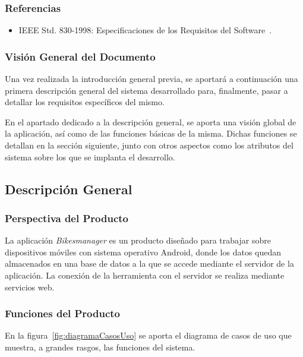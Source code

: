 \subsubsection{Referencias}

\begin{itemize}
	\item IEEE Std. 830-1998: Especificaciones de los Requisitos del Software~\cite{IE830}.
\end{itemize}

\subsubsection{Visión General del Documento}

Una vez realizada la introducción general previa, se aportará a continuación una primera descripción general del sistema desarrollado para, finalmente, pasar a detallar los requisitos específicos del mismo.

En el apartado dedicado a la descripción general, se aporta una visión global de la aplicación, así como de las funciones básicas de la misma. Dichas funciones se detallan en la sección siguiente, junto con otros aspectos como los atributos del sistema sobre los que se implanta el desarrollo.

\subsection{Descripción General}

\subsubsection{Perspectiva del Producto}

La aplicación \emph{Bikesmanager} es un producto diseñado para trabajar sobre dispositivos móviles con sistema operativo Android, donde los datos quedan almacenados en una base de datos a la que se accede mediante el servidor de la aplicación. La conexión de la herramienta con el servidor se realiza mediante servicios web.

\subsubsection{Funciones del Producto}

En la figura~\ref{fig:diagramaCasosUso} se aporta el diagrama de casos de uso que muestra, a grandes rasgos, las funciones del sistema.

